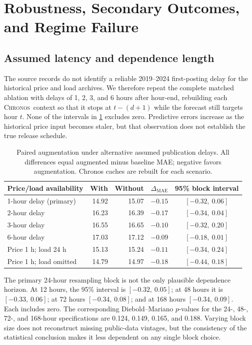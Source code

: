 \documentclass[11pt,letterpaper]{article}
\newcommand{\MAE}{\ensuremath{\mathrm{MAE}}}
\newcommand{\Chronos}{\textsc{Chronos}}
\begin{document}
\section{Robustness, Secondary Outcomes, and Regime Failure}\label{sec:robust}
\subsection{Assumed latency and dependence length}
The source records do not identify a reliable 2019--2024 first-posting delay for the historical price and load archives. We therefore repeat the complete matched ablation with delays of 1, 2, 3, and 6 hours after hour-end, rebuilding each \Chronos\ context so that it stops at $t-(d+1)$ while the forecast still targets hour $t$. None of the intervals in \cref{tab:latency} excludes zero. Predictive errors increase as the historical price input becomes staler, but that observation does not establish the true release schedule.

\begin{table}[t]
\centering\small
\caption{Paired augmentation under alternative assumed publication delays. All differences equal augmented minus baseline MAE; negative favors augmentation. Chronos caches are rebuilt for each scenario.}\label{tab:latency}
\begin{tabular}{@{}lrrrc@{}}
\toprule
Price/load availability & With & Without & $\Delta_{\MAE}$ & 95\% block interval\\
\midrule
1-hour delay (primary) & 14.92 & 15.07 & $-0.15$ & $[-0.32,\ 0.06]$\\
2-hour delay & 16.23 & 16.39 & $-0.17$ & $[-0.34,\ 0.04]$\\
3-hour delay & 16.55 & 16.65 & $-0.10$ & $[-0.32,\ 0.20]$\\
6-hour delay & 17.03 & 17.12 & $-0.09$ & $[-0.18,\ 0.01]$\\
Price 1 h; load 24 h & 15.13 & 15.24 & $-0.11$ & $[-0.34,\ 0.24]$\\
Price 1 h; load omitted & 14.79 & 14.97 & $-0.18$ & $[-0.44,\ 0.18]$\\
\bottomrule
\end{tabular}
\end{table}

The primary 24-hour resampling block is not the only plausible dependence horizon. At 12 hours, the 95\% interval is $[-0.32,\ 0.05]$; at 48 hours it is $[-0.33,\ 0.06]$; at 72 hours $[-0.34,\ 0.08]$; and at 168 hours $[-0.34,\ 0.09]$. Each includes zero. The corresponding Diebold--Mariano $p$-values for the 24-, 48-, 72-, and 168-hour specifications are 0.124, 0.149, 0.165, and 0.188. Varying block size does not reconstruct missing public-data vintages, but the consistency of the statistical conclusion makes it less dependent on any single block choice.
\end{document}
